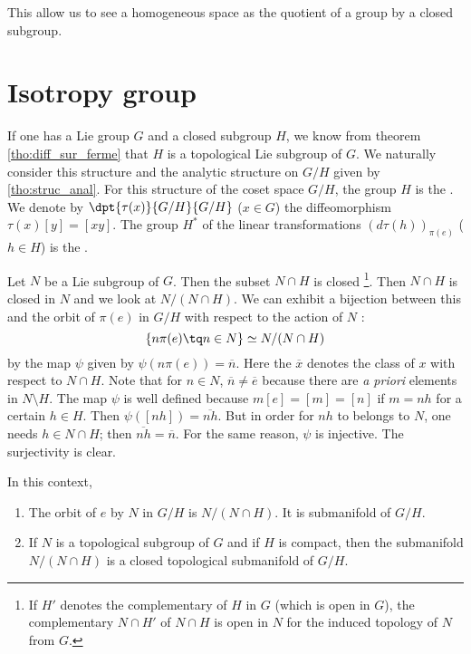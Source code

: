 This allow us to see a homogeneous space as the quotient of a group by a closed subgroup.

\section{Isotropy group}

If one has a Lie group $G$ and a closed subgroup $H$, we know from theorem \ref{tho:diff_sur_ferme} that $H$ is a topological Lie subgroup of $G$. We naturally consider this structure and the analytic structure on $G/H$ given by \ref{tho:struc_anal}. For this structure of the coset space $G/H$, the group $H$ is the . We denote by $\dpt{\tau(x)}{G/H}{G/H}$ ($x\in G$) the diffeomorphism $\tau(x)[y]=[xy]$. The group $H^*$ of the linear transformations $(d\tau(h))_{\pi(e)}$ ($h\in H$) is the .


Let $N$ be a Lie subgroup of $G$. Then the subset $N\cap H$ is closed
\footnote{If $H'$ denotes the complementary of $H$ in $G$ (which is open in $G$), the complementary $N\cap H'$ of $N\cap H$ is open in $N$ for the induced topology of $N$ from $G$.}. Then $N\cap H$ is closed in $N$ and we look at $N/(N\cap H)$. We can exhibit a bijection between this and the orbit of $\pi(e)$ in $G/H$ with respect to the action of $N$ :
\begin{equation}
  \{ n\pi(e)\tq n\in N \}\simeq N/(N\cap H)
\end{equation}
by the map $\psi$ given by $\psi(n\pi(e))=\overline{n}$. Here the $\overline{ x }$ denotes the class of $x$ with respect to $N\cap H$. Note that for $n\in N$, $\overline{n}\neq\overline{e}$ because there are \emph{a priori} elements in $N\setminus H$. The map $\psi$ is well defined because $m[e]=[m]=[n]$ if $m=nh$ for a certain $h\in H$. Then $\psi([nh])=\overline{nh}$. But in order for $nh$ to belongs to $N$, one needs $h\in N\cap H$; then $\overline{nh}=\overline{n}$. For the same reason, $\psi$ is injective. The surjectivity is clear.

\begin{proposition}			\label{prop:orbit_N_ss_var}
	In this context,
	\begin{enumerate}
		\item The orbit of $e$ by $N$ in $G/H$ is $N/(N\cap H)$. It is submanifold of $G/H$.
		\item If $N$ is a topological subgroup of $G$ and if $H$ is compact, then the submanifold $N/(N\cap H)$ is a closed topological submanifold of $G/H$.
	\end{enumerate}
\end{proposition}

